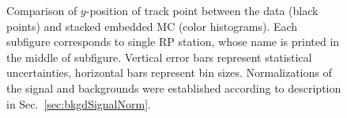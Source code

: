 \begin{figure}[h]
{\begin{subfigure}[b]{\linewidth}
  \end{subfigure}
    \begin{minipage}[t][1.042\linewidth][t]{\linewidth}\end{minipage}
}
\caption[Comparison of $y$-position of track point between the data and stacked embedded MC.]{Comparison of $y$-position of track point between the data (black points) and stacked embedded MC (color histograms). Each subfigure corresponds to single RP station, whose name is printed in the middle of subfigure. Vertical error bars represent statistical uncertainties, horizontal bars represent bin sizes. Normalizations of the signal and backgrounds were established according to description in Sec.~\ref{sec:bkgdSignalNorm}.}\label{fig:yRp}%
\end{figure}






